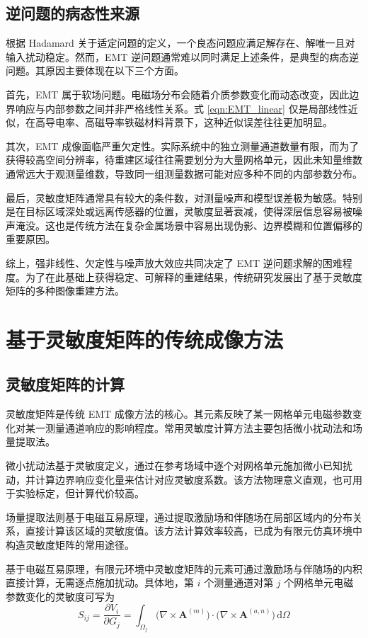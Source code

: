 \subsection{逆问题的病态性来源}

根据 Hadamard 关于适定问题的定义，一个良态问题应满足解存在、解唯一且对输入扰动稳定。然而，EMT 逆问题通常难以同时满足上述条件，是典型的病态逆问题。其原因主要体现在以下三个方面。

首先，EMT 属于软场问题。电磁场分布会随着介质参数变化而动态改变，因此边界响应与内部参数之间并非严格线性关系。式 \eqref{eqn:EMT_linear} 仅是局部线性近似，在高导电率、高磁导率铁磁材料背景下，这种近似误差往往更加明显。

其次，EMT 成像面临严重欠定性。实际系统中的独立测量通道数量有限，而为了获得较高空间分辨率，待重建区域往往需要划分为大量网格单元，因此未知量维数通常远大于观测量维数，导致同一组测量数据可能对应多种不同的内部参数分布。

最后，灵敏度矩阵通常具有较大的条件数，对测量噪声和模型误差极为敏感。特别是在目标区域深处或远离传感器的位置，灵敏度显著衰减，使得深层信息容易被噪声淹没。这也是传统方法在复杂金属场景中容易出现伪影、边界模糊和位置偏移的重要原因。

综上，强非线性、欠定性与噪声放大效应共同决定了 EMT 逆问题求解的困难程度。为了在此基础上获得稳定、可解释的重建结果，传统研究发展出了基于灵敏度矩阵的多种图像重建方法。

\section{基于灵敏度矩阵的传统成像方法}

\subsection{灵敏度矩阵的计算}

灵敏度矩阵是传统 EMT 成像方法的核心。其元素反映了某一网格单元电磁参数变化对某一测量通道响应的影响程度。常用灵敏度计算方法主要包括微小扰动法和场量提取法\citep{griffiths2001magnetic}。

微小扰动法基于灵敏度定义，通过在参考场域中逐个对网格单元施加微小已知扰动，并计算边界响应变化量来估计对应灵敏度系数。该方法物理意义直观，也可用于实验标定，但计算代价较高。

场量提取法则基于电磁互易原理，通过提取激励场和伴随场在局部区域内的分布关系，直接计算该区域的灵敏度值。该方法计算效率较高，已成为有限元仿真环境中构造灵敏度矩阵的常用途径。

基于电磁互易原理，有限元环境中灵敏度矩阵的元素可通过激励场与伴随场的内积直接计算，无需逐点施加扰动。具体地，第 $i$ 个测量通道对第 $j$ 个网格单元电磁参数变化的灵敏度可写为
\begin{equation}
\label{eqn:sensitivity_reciprocity}
S_{ij}
=
\frac{\partial V_i}{\partial G_j}
=
\int_{\Omega_j}
\bigl( \nabla \times \mathbf{A}^{(m)} \bigr)
\cdot
\bigl( \nabla \times \mathbf{A}^{(a,n)} \bigr)
\,\mathrm{d}\Omega
\end{equation}

